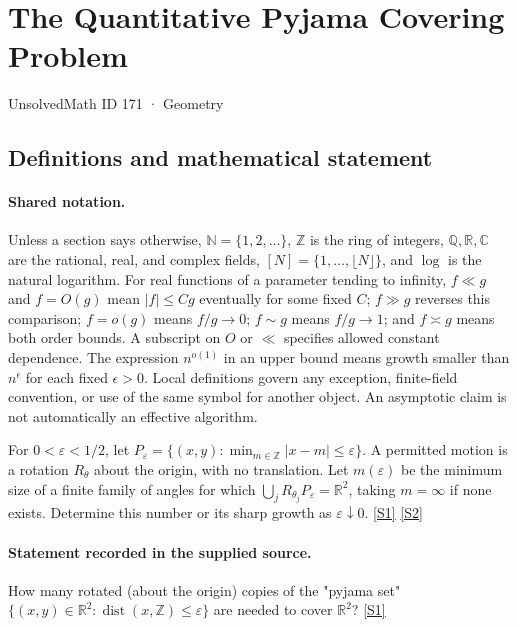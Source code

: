 \documentclass[11pt,a4paper]{article}
\newcommand{\N}{\mathbb{N}}
\newcommand{\Z}{\mathbb{Z}}
\newcommand{\Q}{\mathbb{Q}}
\newcommand{\R}{\mathbb{R}}
\newcommand{\C}{\mathbb{C}}
\newcommand{\sref}[2]{\hyperlink{source:#1:#2}{[S#2]}}
\begin{document}

\setcounter{section}{170}

\section{The Quantitative Pyjama Covering Problem}\label{171}

{\small\sffamily UnsolvedMath ID 171 · Geometry}

\subsection{Definitions and mathematical statement}

\paragraph{Shared notation.}Unless a section says otherwise, $\N=\{1,2,\ldots\}$,
$\Z$ is the ring of integers, $\Q,\R,\C$ are the rational, real, and complex
fields, $[N]=\{1,\ldots,\lfloor N\rfloor\}$, and $\log$ is the natural
logarithm. For real functions of a parameter tending to infinity,
$f\ll g$ and $f=O(g)$ mean $|f|\leq Cg$ eventually for some fixed $C$;
$f\gg g$ reverses this comparison; $f=o(g)$ means $f/g\to0$;
$f\sim g$ means $f/g\to1$; and $f\asymp g$ means both order bounds.
A subscript on $O$ or $\ll$ specifies allowed constant dependence.
The expression $n^{o(1)}$ in an upper bound means growth smaller than
$n^\epsilon$ for each fixed $\epsilon>0$. Local definitions govern any
exception, finite-field convention, or use of the same symbol for another
object. An asymptotic claim is not automatically an effective algorithm.



For $0<\varepsilon<1/2$, let $P_\varepsilon=\{(x,y):\min_{m\in\Z}|x-m|\leq\varepsilon\}$. A permitted motion is a rotation $R_\theta$ about the origin, with no translation. Let $m(\varepsilon)$ be the minimum size of a finite family of angles for which $\bigcup_j R_{\theta_j}P_\varepsilon=\R^2$, taking $m=\infty$ if none exists. Determine this number or its sharp growth as $\varepsilon\downarrow0$. \sref{171}{1} \sref{171}{2}

\paragraph{Statement recorded in the supplied source.}
How many rotated (about the origin) copies of the "pyjama set" $\{(x, y) \in \mathbb{R}^2 : \operatorname{dist}(x, \mathbb{Z}) \leq \varepsilon\}$ are needed to cover $\mathbb{R}^2$? \sref{171}{1}
\end{document}
